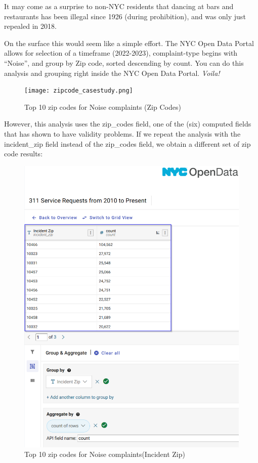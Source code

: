 \documentclass[12pt, titlepage]{article}
\begin{document}
		It may come as a surprise to non-NYC residents that dancing at bars and restaurants has been illegal since 1926 (during prohibition), and was only just repealed in 2018. 
		
		On the surface this would seem like a simple effort.  The NYC Open Data Portal allows for selection of a timeframe (2022-2023), complaint-type
		begins with ``Noise'', and group by Zip code, sorted descending by count.  You can do this analysis and grouping right inside the NYC Open Data Portal. \textit{Voila!}

	\begin{figure}[H]
	    		\centering
	    		\texttt{[image: zipcode\_casestudy.png]}
	    		\caption{Top 10 zip codes for Noise complaints (Zip Codes)}
	    	\label{fig:casestudy1-zipcodes}
		\end{figure}
	
		However, this analysis uses the zip\_codes field, one of the (six) computed fields that has shown to have validity problems. If we repeat the analysis with the 
		incident\_zip field instead of the zip\_codes field, we obtain a different set of zip code results:
		
		\begin{figure}[H]
	    		\centering
	    		\includegraphics[scale = 0.6]{incident_zip_casestudy.png}
	    		\caption{Top 10 zip codes for Noise complaints(Incident Zip)}
	    	\label{fig:casestudy1-incident-zip}
		\end{figure}
		
\end{document}
